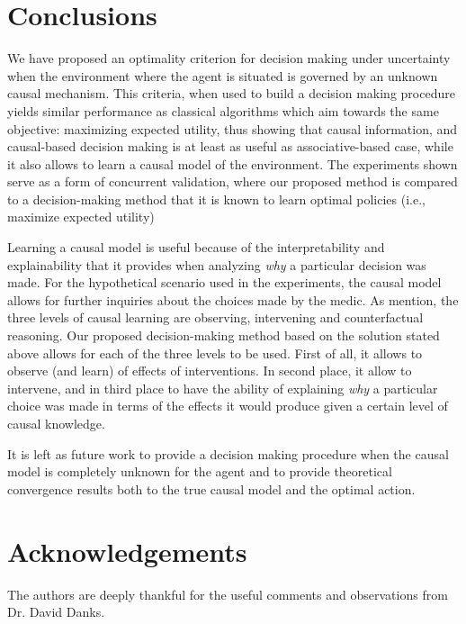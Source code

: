 \documentclass[letterpaper]{article} %
\theoremstyle{plain}
\begin{document}
\section{Conclusions}
We have proposed an optimality criterion for decision making under uncertainty when the environment where the agent is situated is governed by an unknown causal mechanism. This criteria, when used to build a decision making procedure yields similar performance as classical algorithms which aim towards the same objective: maximizing expected utility, thus showing that causal information, and causal-based decision making is at least as useful as associative-based case, while it also allows to learn a causal model of the environment. The experiments shown serve as a form of concurrent validation, where our proposed method is compared to a decision-making method that it is known to learn optimal policies (i.e., maximize expected utility)

Learning a causal model is useful because of the interpretability and explainability that it provides when analyzing \textit{why} a particular decision was made. For the hypothetical scenario used in the experiments, the causal model allows for further inquiries about the choices made by the medic. As \cite{pearl2018why} mention, the three levels of causal learning are observing, intervening and counterfactual reasoning. Our proposed decision-making method based on the solution stated above allows for each of the three levels to be used. First of all, it allows to observe (and learn) of effects of interventions. In second place, it allow to intervene, and in third place to have the ability of explaining \textit{why} a particular choice was made in terms of the effects it would produce given a certain level of causal knowledge.

It is left as future work to provide a decision making procedure when the causal model is completely unknown for the agent and to provide theoretical convergence results both to the true causal model and the optimal action.

\section{Acknowledgements}
The authors are deeply thankful for the useful comments and observations from Dr. David Danks. 


\end{document}
